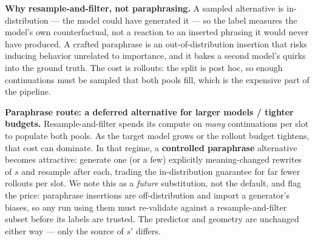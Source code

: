 \documentclass[11pt]{article}
\begin{document}
\begin{honestbox}
\textbf{Why resample-and-filter, not paraphrasing.} A sampled alternative is in-distribution --- the model could have generated it --- so the label measures the model's own counterfactual, not a reaction to an inserted phrasing it would never have produced. A crafted paraphrase is an out-of-distribution insertion that risks inducing behavior unrelated to importance, and it bakes a second model's quirks into the ground truth. The cost is rollouts: the split is post hoc, so enough continuations must be sampled that both pools fill, which is the expensive part of the pipeline.
\end{honestbox}

\begin{honestbox}
\textbf{Paraphrase route: a deferred alternative for larger models / tighter budgets.} Resample-and-filter spends its compute on \emph{many} continuations per slot to populate both pools. As the target model grows or the rollout budget tightens, that cost can dominate. In that regime, a \textbf{controlled paraphrase} alternative becomes attractive: generate one (or a few) explicitly meaning-changed rewrites of $s$ and resample after each, trading the in-distribution guarantee for far fewer rollouts per slot. We note this as a \emph{future} substitution, not the default, and flag the price: paraphrase insertions are off-distribution and import a generator's biases, so any run using them must re-validate against a resample-and-filter subset before its labels are trusted. The predictor and geometry are unchanged either way --- only the source of $s'$ differs.
\end{honestbox}
\end{document}
